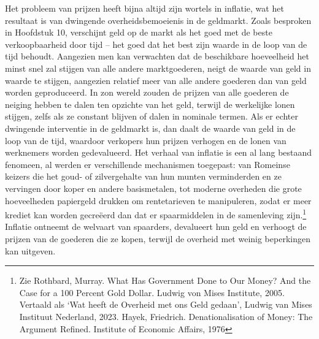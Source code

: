 Het probleem van prijzen heeft bijna altijd zijn wortels in inflatie, wat het resultaat is van dwingende overheidsbemoeienis in de geldmarkt. Zoals besproken in Hoofdstuk 10, verschijnt geld op de markt als het goed met de beste verkoopbaarheid door tijd -- het goed dat het best zijn waarde in de loop van de tijd behoudt. Aangezien men kan verwachten dat de beschikbare hoeveelheid het minst snel zal stijgen van alle andere marktgoederen, neigt de waarde van geld in waarde te stijgen, aangezien relatief meer van alle andere goederen dan van geld worden geproduceerd. In zo\textquotesingle n wereld zouden de prijzen van alle goederen de neiging hebben te dalen ten opzichte van het geld, terwijl de werkelijke lonen stijgen, zelfs als ze constant blijven of dalen in nominale termen. Als er echter dwingende interventie in de geldmarkt is, dan daalt de waarde van geld in de loop van de tijd, waardoor verkopers hun prijzen verhogen en de lonen van werknemers worden gedevalueerd. Het verhaal van inflatie is een al lang bestaand fenomeen, al werden er verschillende mechanismen toegepast: van Romeinse keizers die het goud- of zilvergehalte van hun munten verminderden en ze vervingen door koper en andere basismetalen, tot moderne overheden die grote hoeveelheden papiergeld drukken om rentetarieven te manipuleren, zodat er meer krediet kan worden gecreëerd dan dat er spaarmiddelen in de samenleving zijn.\footnote{Zie Rothbard, Murray. What Has Government Done to Our Money? And the Case for a 100 Percent Gold Dollar. Ludwig von Mises Institute, 2005. Vertaald als `Wat heeft de Overheid met ons Geld gedaan', Ludwig van Mises Instituut Nederland, 2023. Hayek, Friedrich. Denationalisation of Money: The Argument Refined. Institute of Economic Affairs, 1976} Inflatie ontneemt de welvaart van spaarders, devalueert hun geld en verhoogt de prijzen van de goederen die ze kopen, terwijl de overheid met weinig beperkingen kan uitgeven.

